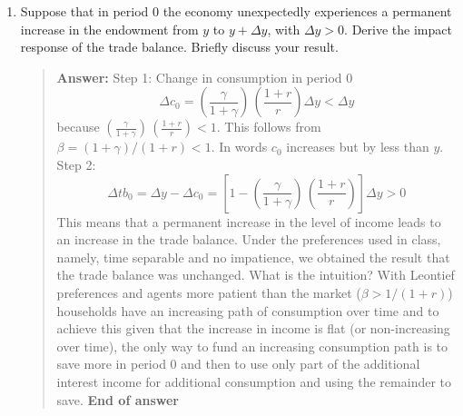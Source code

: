\begin{exercise}
\begin{enumerate}
\begin{quote}
To finance a growing stream of consumption with a fixed endowment income, it must be that debt falls over time. In fact debt turns into assets and then grows without bounds but at a rate less that $r$. 

Asymptotically the growth rate of assets ($-d_t$) is 
\[
\lim_{t\rightarrow \infty} \frac{(-d_t) - (-d_{t-1})}{-d_{t-1}}
 = 
\lim_{t\rightarrow \infty}  \left[ 1- \left(\frac{\gamma}{1+\gamma}\right) \, \left( \frac{1+r}{r}\right) \right]  \frac{(y -r d_{t-1})}{-d_{t-1}} 
= r  \left[ 1- \left(\frac{\gamma}{1+\gamma}\right) \, \left( \frac{1+r}{r}\right) \right]
\]
which uses $\lim_{t\rightarrow \infty} y/d_{t-1} =0$ because $-d_{t-1}$ increases without bound. 
The gross growth rate of $-d_t$ is equal to $1+r  \left[ 1- \left(\frac{\gamma}{1+\gamma}\right) \, \left( \frac{1+r}{r}\right) \right] = (1+r)/(1+\gamma)<1+r$. 

The growth rate of consumption is $\beta^{-1} = (1+r)/(1+\gamma)$, which is the same as the asymptotic growth rate of assets. 

{\bf End of answer}


\end{quote}



\item Suppose that in period 0 the economy unexpectedly experiences a permanent increase in the endowment from $y$ to $y+\Delta y$, with $\Delta y>0$. Derive the impact response of the trade balance. Briefly discuss your result. 
\begin{quote}
{\bf Answer: } 
Step 1: Change in consumption in period 0
\[
\Delta c_0 = \left(\frac{\gamma}{1+\gamma}\right) \, \left( \frac{1+r}{r}\right)  \Delta y  < \Delta y 
\]
because $\left(\frac{\gamma}{1+\gamma}\right) \, \left( \frac{1+r}{r}\right)<1$. This follows from $\beta = (1+\gamma)/(1+r) <1$.  In words $c_0$ increases but by less than $y$. 
Step 2: 
\[
\Delta tb_0 = \Delta y - \Delta c_0 = \left[1 - 
\left(\frac{\gamma}{1+\gamma}\right) \, \left( \frac{1+r}{r}\right) \right] \Delta y >0
\]
This means that  a permanent increase in the level of income leads to an increase in the trade balance. Under the preferences used in class, namely, time separable and no impatience, we obtained the result that the trade balance was unchanged. What is the intuition? With Leontief preferences and  agents  more patient than the market ($\beta > 1/(1+r)$) households have an increasing path of consumption over time and to achieve this given that the increase in income is flat (or non-increasing over time), the only way to fund an increasing consumption path is to save more in period 0 and then to use only part of the additional interest income for additional consumption and using the remainder to save. 
{\bf End of answer}
\end{quote}


\end{enumerate}
\end{exercise}
